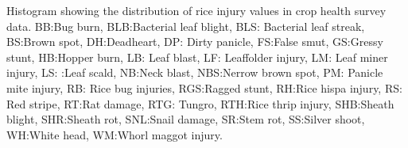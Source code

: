 Histogram showing the distribution of rice injury values in crop health survey data. BB:Bug burn, BLB:Bacterial leaf blight, BLS: Bacterial leaf streak, BS:Brown spot, DH:Deadheart, DP: Dirty panicle, FS:False smut, GS:Gressy stunt, HB:Hopper burn, LB: Leaf blast, LF: Leaffolder injury, LM: Leaf miner injury, LS: :Leaf scald, NB:Neck blast, NBS:Nerrow brown spot, PM: Panicle mite injury, RB: Rice bug injuries, RGS:Ragged stunt, RH:Rice hispa injury, RS: Red stripe, RT:Rat damage, RTG: Tungro, RTH:Rice thrip injury, SHB:Sheath blight, SHR:Sheath rot, SNL:Snail damage, SR:Stem rot, SS:Silver shoot, WH:White head, WM:Whorl maggot injury.